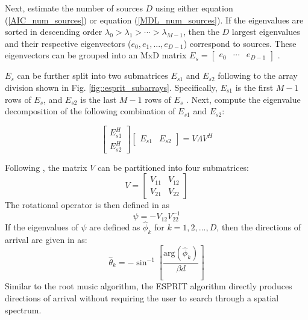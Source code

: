 \documentclass[conference]{IEEEtran}
\begin{document}
		Next, estimate the number of sources $D$ using either equation (\ref{AIC_num_sources}) or equation (\ref{MDL_num_sources}). If the eigenvalues are sorted in descending order $\lambda_0 > \lambda_1 > \cdots > \lambda_{M-1}$, then the $D$ largest eigenvalues and their respective eigenvectors ($e_0, e_1, ..., e_{D-1}$) correspond to sources. These eigenvectors can be grouped into an MxD matrix $E_s = \begin{bmatrix} e_0 & \cdots & e_{D-1} \end{bmatrix}$ \cite{doa_algorithms_raghu}.
		
		$E_s$ can be further split into two submatrices $E_{s1}$ and $E_{s2}$ following to the array division shown in Fig. \ref{fig::esprit_subarrays}. Specifically, $E_{s1}$ is the first $M-1$ rows of $E_s$, and $E_{s2}$ is the last $M-1$ rows of $E_s$ \cite{doa_algorithms_raghu}. Next, compute the eigenvalue decomposition of the following combination of $E_{s1}$ and $E_{s2}$:
		
		\begin{equation}
			\begin{bmatrix}
				E_{s1}^H\\[6pt]
				E_{s2}^H
			\end{bmatrix}
			\begin{bmatrix}
				E_{s1} & E_{s2}
			\end{bmatrix}
			= V{\Lambda}V^H
		\end{equation}
		
		Following \cite{doa_algorithms_raghu}, the matrix $V$ can be partitioned into four submatrices:
		\begin{equation*}
			V = \begin{bmatrix}
				V_{11} & V_{12}\\[6pt]
				V_{21} & V_{22}
			\end{bmatrix}
		\end{equation*}
		The rotational operator is then defined in \cite{root_music_esprit_patwari} as
		\begin{equation*}
			\psi = -V_{12}V_{22}^{-1}
		\end{equation*}
		If the eigenvalues of $\psi$ are defined as $\hat{\phi}_k$ for $k = 1,2,...,D$, then the directions of arrival are given in \cite{root_music_esprit_patwari} as:
		\begin{equation}
			\hat{\theta}_k = -\sin^{-1}{\left[\frac{\text{arg}(\hat{\phi}_k)}{{\beta}d}\right]}
		\end{equation}
		Similar to the root music algorithm, the ESPRIT algorithm directly produces directions of arrival without requiring the user to search through a spatial spectrum.
		
\end{document}
